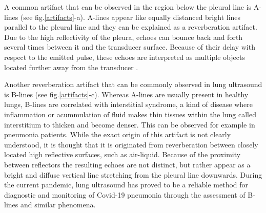 \documentclass[12pt]{article} %
\begin{document}
	A common artifact that can be observed in the region below the pleural line is A-lines (see fig.\ref{artifacts}-a). A-lines appear like equally distanced bright lines parallel to the pleural line and they can be explained as a reverberation artifact. Due to the high reflectivity of the pleura, echoes can bounce back and forth several times between it and the transducer surface. Because of their delay with respect to the emitted pulse, these echoes are interpreted as multiple objects located further away from the transducer \cite{artifacts}.

	
	Another reverberation artifact that can be commonly observed in lung ultrasound is B-lines (see fig.\ref{artifacts}-c). Whereas A-lines are usually present in healthy lungs, B-lines are correlated with interstitial syndrome, a kind of disease where inflammation or acummulation of fluid makes thin tissues within the lung called interstitium to thicken and become denser. This can be observed for example in pneumonia patients. While the exact origin of this artifact is not clearly understood, it is thought that it is originated from reverberation between closely located high reflective surfaces, such as air-liquid. Because of the proximity between reflectors the resulting echoes are not distinct, but rather appear as a bright and diffuse vertical line stretching from the pleural line downwards. During the current pandemic, lung ultrasound has proved to be a reliable method for diagnostic and monitoring of Covid-19 pneumonia through the assessment of B-lines and similar phenomena.
	
\end{document}
